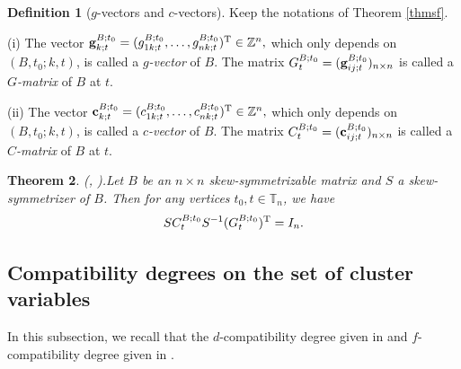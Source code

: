 \documentclass{amsart}
\newtheorem{theorem}{Theorem}[section]
\theoremstyle{definition}
\newtheorem{definition}[theorem]{Definition}
\theoremstyle{remark}
\numberwithin{equation}{section}
\begin{document}
\begin{definition}[$g$-vectors and $c$-vectors]
 Keep the notations of Theorem \ref{thmsf}.

 (i) The vector ${\bf g}_{k;t}^{B;t_0}=(g_{1k;t}^{B;t_0},\ldots,g_{nk;t}^{B;t_0})^{\rm T}\in \mathbb Z^n,$
 which only depends on $(B,t_0;k,t)$, is called a {\em $g$-vector} of $B$. The matrix $G_t^{B;t_0}=({\bf g}_{ij;t}^{B;t_0})_{n\times n}$ is called a {\em $G$-matrix} of $B$ at $t$.

 (ii) The vector ${\bf c}_{k;t}^{B;t_0}=(c_{1k;t}^{B;t_0},\ldots,c_{nk;t}^{B;t_0})^{\rm T}\in \mathbb Z^n,$
 which only depends on $(B,t_0;k,t)$, is called a {\em $c$-vector} of $B$. The matrix $C_t^{B;t_0}=({\bf c}_{ij;t}^{B;t_0})_{n\times n}$ is called a {\em $C$-matrix} of $B$ at $t$.
\end{definition}

\begin{theorem}{\rm (}\cite[(3.11)]{NZ}, \cite[Corollary 4.11]{CL}{\rm ).}\label{thmcg} Let $B$ be an $n\times n$ skew-symmetrizable matrix and $S$ a skew-symmetrizer of $B$. Then for any vertices $t_0, t\in\mathbb T_n$, we have
$$SC_t^{B;t_0}S^{-1}(G_t^{B;t_0})^{\rm T}=I_n.$$
\end{theorem}




\subsection{Compatibility degrees on the set of cluster variables}
In this subsection, we recall that the $d$-compatibility degree given in \cite{CL1} and $f$-compatibility degree given in \cite{FG}.
\end{document}
